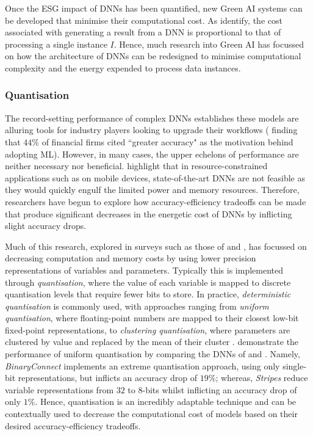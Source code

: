 \documentclass[a4paper, 11pt]{report}
\begin{document}
    Once the ESG impact of DNNs has been quantified, new Green AI systems can be developed that minimise their computational cost. As \citet{schwartz-2019} identify, the cost associated with generating a result from a DNN is proportional to that of processing a single instance $I$. Hence, much research into Green AI has focussed on how the architecture of DNNs can be redesigned to minimise computational complexity and the energy expended to process data instances. 


    \subsubsection{Quantisation}
    \label{section: quantisation}

    The record-setting performance of complex DNNs establishes these models are alluring tools for industry players looking to upgrade their workflows (\citet{chartis-2019} finding that $44\%$ of financial firms cited ``greater accuracy" as the motivation behind adopting ML). However, in many cases, the upper echelons of performance are neither necessary nor beneficial. \citet{kumar-2020} highlight that in resource-constrained applications such as on mobile devices, state-of-the-art DNNs are not feasible as they would quickly engulf the limited power and memory resources. Therefore, researchers have begun to explore how accuracy-efficiency tradeoffs can be made that produce significant decreases in the energetic cost of DNNs by inflicting slight accuracy drops.

    Much of this research, explored in surveys such as those of \citet{xu-2021} and \citet{cai-2022}, has focussed on decreasing computation and memory costs by using lower precision representations of variables and parameters. Typically this is implemented through \emph{quantisation}, where the value of each variable is mapped to discrete quantisation levels that require fewer bits to store. In practice, \emph{deterministic quantisation} is commonly used, with approaches ranging from \emph{uniform quantisation}, where floating-point numbers are mapped to their closest low-bit fixed-point representations, to \emph{clustering quantisation}, where parameters are clustered by value and replaced by the mean of their cluster \citep{xu-2021}. \citet{kumar-2020} demonstrate the performance of uniform quantisation by comparing the DNNs of \citet{courbariaux-2015} and \citet{judd-2016}. Namely, \emph{BinaryConnect} \citep{courbariaux-2015} implements an extreme quantisation approach, using only single-bit representations, but inflicts an accuracy drop of $19\%$; whereas, \emph{Stripes} \citep{judd-2016} reduce variable representations from $32$ to $8$-bits whilst inflicting an accuracy drop of only $1\%$. Hence, quantisation is an incredibly adaptable technique and can be contextually used to decrease the computational cost of models based on their desired accuracy-efficiency tradeoffs.
\end{document}
